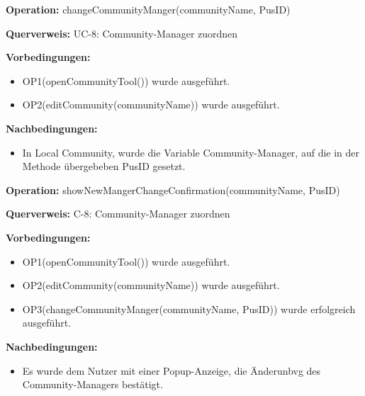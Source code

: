 \documentclass[a4paper,12pt]{article}
\begin{document}
	\begin{contractbox}
		\textbf{Operation:} changeCommunityManger(communityName, PusID)
		
			\textbf{Querverweis:} UC-8: Community-Manager zuordnen
			
		\textbf{Vorbedingungen:}
		\begin{itemize}[noitemsep]
			\item OP1(openCommunityTool()) wurde ausgeführt.
			\item OP2(editCommunity(communityName)) wurde ausgeführt.
		\end{itemize}
		
		\textbf{Nachbedingungen:}
		\begin{itemize}[noitemsep]
			\item In Local Community, wurde die Variable Community-Manager, auf die in der Methode übergebeben PusID gesetzt.
		\end{itemize}
	\end{contractbox}

	\begin{contractbox}
		\textbf{Operation:} showNewMangerChangeConfirmation(communityName, PusID)
		
			\textbf{Querverweis:} C-8: Community-Manager zuordnen
		
		\textbf{Vorbedingungen:}
		\begin{itemize}[noitemsep]
			\item OP1(openCommunityTool()) wurde ausgeführt.
			\item OP2(editCommunity(communityName)) wurde ausgeführt.
			\item OP3(changeCommunityManger(communityName, PusID)) wurde erfolgreich ausgeführt.
		\end{itemize}
		
		\textbf{Nachbedingungen:}
		\begin{itemize}[noitemsep]
			\item Es wurde dem Nutzer mit einer Popup-Anzeige, die Änderunbvg des Community-Managers bestätigt.
		\end{itemize}
	\end{contractbox}
\end{document}
